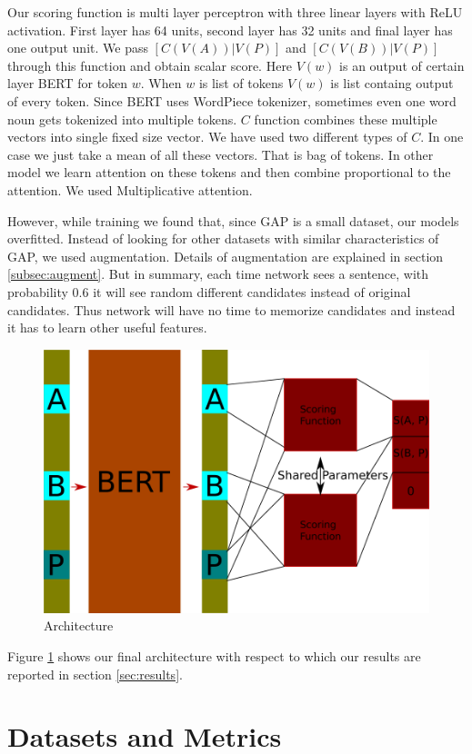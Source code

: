 \documentclass[11pt,a4paper]{article}
\begin{document}
Our scoring function is multi layer perceptron with three linear layers with ReLU activation. First layer has 64 units, second layer has 32 units and final layer has one output unit. We pass $[C(V(A))|V(P)]$ and $[C(V(B))|V(P)]$ through this function and obtain scalar score. Here $V(w)$ is an output of certain layer BERT for token $w$. When $w$ is list of tokens $V(w)$ is list containg output of every token. Since BERT uses WordPiece tokenizer, sometimes even one word noun gets tokenized into multiple tokens. $C$ function combines these multiple vectors into single fixed size vector. We have used two different types of $C$. In one case we just take a mean of all these vectors. That is bag of tokens. In other model we learn attention on these tokens and then combine proportional to the attention. We used Multiplicative attention.

However, while training we found that, since GAP is a small dataset, our models overfitted. Instead of looking for other datasets with similar characteristics of GAP, we used augmentation. Details of augmentation are explained in section \ref{subsec:augment}. But in summary, each time network sees a sentence, with probability 0.6 it will see random different candidates instead of original candidates. Thus network will have no time to memorize candidates and instead it has to learn other useful features.



\begin{figure}
  \centering
  \includegraphics[width=.4\textwidth]{arch.png}
  \caption{Architecture}
  \label{fig:arch}
\end{figure}

Figure \ref{fig:arch} shows our final architecture with respect to which our results are reported in section \ref{sec:results}.
\section{Datasets and Metrics}
\end{document}
